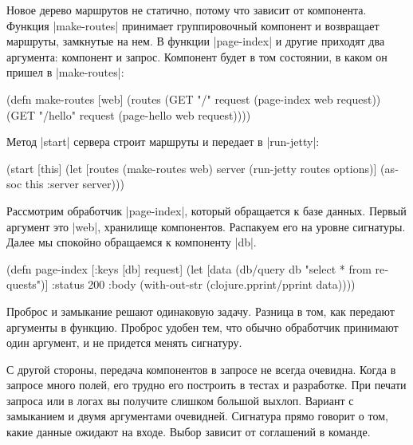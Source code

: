 Новое дерево маршрутов не статично, потому что зависит от компонента. Функция
\spverb|make-routes| принимает группировочный компонент и возвращает маршруты,
замкнутые на нем. В функции \spverb|page-index| и другие приходят два аргумента:
компонент и запрос. Компонент будет в том состоянии, в каком он пришел в
\spverb|make-routes|:

\begin{english}
  \begin{clojure}
(defn make-routes [web]
  (routes
   (GET "/"      request (page-index web request))
   (GET "/hello" request (page-hello web request))))
  \end{clojure}
\end{english}

\noindent
Метод \spverb|start| сервера строит маршруты и передает в \spverb|run-jetty|:

\begin{english}
  \begin{clojure}
(start [this]
  (let [routes (make-routes web)
        server (run-jetty routes options)]
    (assoc this :server server)))
  \end{clojure}
\end{english}

Рассмотрим обработчик \spverb|page-index|, который обращается к базе
данных. Первый аргумент это \spverb|web|, хранилище компонентов. Распакуем его
на уровне сигнатуры. Далее мы спокойно обращаемся к компоненту \spverb|db|.

\begin{english}
  \begin{clojure}
(defn page-index
  [{:keys [db]} request]
  (let [data (db/query db "select * from requests")]
    {:status 200
     :body (with-out-str
             (clojure.pprint/pprint data))}))
  \end{clojure}
\end{english}

Проброс и замыкание решают одинаковую задачу. Разница в том, как передают
аргументы в функцию. Проброс удобен тем, что обычно обработчик принимают один
аргумент, и не придется менять сигнатуру.

С другой стороны, передача компонентов в запросе не всегда очевидна. Когда в
запросе много полей, его трудно его построить в тестах и разработке. При печати
запроса или в логах вы получите слишком большой выхлоп. Вариант с замыканием и
двумя аргументами очевидней. Сигнатура прямо говорит о том, какие данные ожидают
на входе. Выбор зависит от соглашений в команде.

